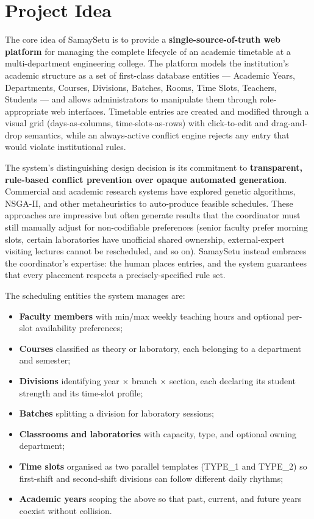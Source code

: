 \section{Project Idea}

The core idea of SamaySetu is to provide a \textbf{single-source-of-truth web platform} for managing the complete lifecycle of an academic timetable at a multi-department engineering college. The platform models the institution's academic structure as a set of first-class database entities --- Academic Years, Departments, Courses, Divisions, Batches, Rooms, Time Slots, Teachers, Students --- and allows administrators to manipulate them through role-appropriate web interfaces. Timetable entries are created and modified through a visual grid (days-as-columns, time-slots-as-rows) with click-to-edit and drag-and-drop semantics, while an always-active conflict engine rejects any entry that would violate institutional rules.

The system's distinguishing design decision is its commitment to \textbf{transparent, rule-based conflict prevention over opaque automated generation}. Commercial and academic research systems have explored genetic algorithms, NSGA-II, and other metaheuristics to auto-produce feasible schedules. These approaches are impressive but often generate results that the coordinator must still manually adjust for non-codifiable preferences (senior faculty prefer morning slots, certain laboratories have unofficial shared ownership, external-expert visiting lectures cannot be rescheduled, and so on). SamaySetu instead embraces the coordinator's expertise: the human places entries, and the system guarantees that every placement respects a precisely-specified rule set.

The scheduling entities the system manages are:
\begin{itemize}
    \item \textbf{Faculty members} with min/max weekly teaching hours and optional per-slot availability preferences;
    \item \textbf{Courses} classified as theory or laboratory, each belonging to a department and semester;
    \item \textbf{Divisions} identifying year $\times$ branch $\times$ section, each declaring its student strength and its time-slot profile;
    \item \textbf{Batches} splitting a division for laboratory sessions;
    \item \textbf{Classrooms and laboratories} with capacity, type, and optional owning department;
    \item \textbf{Time slots} organised as two parallel templates (TYPE\_1 and TYPE\_2) so first-shift and second-shift divisions can follow different daily rhythms;
    \item \textbf{Academic years} scoping the above so that past, current, and future years coexist without collision.
\end{itemize}

